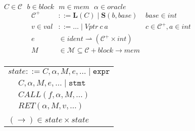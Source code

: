 \documentclass{article}
\begin{document}
\begin{figure}
  \begin{minipage}[t]{0.49\textwidth}
    \vspace{0em}
    \(C \in \mathcal{C}~~~ b \in \mathit{block}~~~  m \in \mathit{mem}~~~ \alpha \in \mathit{oracle}\)
    \[\begin{aligned}
    \mathcal{C}^+ & ::= \mathbf{L}(C) \mid \mathbf{S}(b, \mathit{base}) &
    \mathit{base} \in \mathit{int} \\
    v \in \mathit{val} & ::= \ldots \mid \mathit{Vptr} ~ c ~ a &
    c \in \mathcal{C}^+, a \in \mathit{int} \\
    e & \in \mathit{ident} \rightharpoonup (\mathcal{C}^+ \times \mathit{int}) \\
    M & \in \mathcal{M} \subseteq \mathcal{C} + \mathit{block} \rightarrow \mathit{mem} \\
    \end{aligned}\]
  \end{minipage}
  \begin{minipage}[t]{0.49\textwidth}
    \vspace{0em}
    \begin{tabular}{l | l}
      \multicolumn{2}{r}{\(\mathit{state} ::= C, \alpha, M, e, \ldots \mid \mathtt{expr}\)} \\
      \hspace{4em} & \(C, \alpha, M, e, \ldots \mid \mathtt{stmt}\) \\
      \hspace{4em} & \(\mathit{CALL}(f, \alpha, M, \ldots)\)  \\
      \hspace{4em} & \(\mathit{RET}(\alpha, M, v, \ldots)\) \\
      \multicolumn{2}{l}{} \\
      \multicolumn{2}{l}{\hspace{1.5em}\((\longrightarrow) \in \mathit{state} \times \mathit{state}\)} \\
    \end{tabular}


\end{minipage}
\end{figure}
\end{document}
